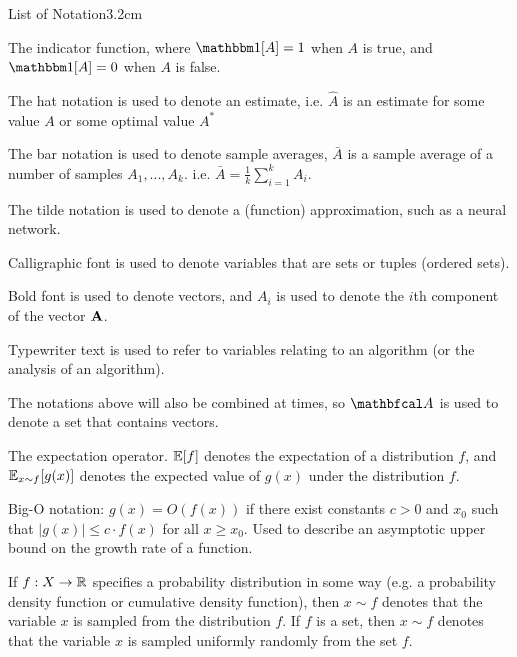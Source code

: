 \begin{mclistof}{List of Notation}{3.2cm}
    \item[\Large\textbf{General Notation}\hfill\hfill]
    \item[$\one$] 
        The indicator function, where $\one[A]=1$ when $A$ is true, and $\one[A]=0$ when $A$ is false. 
    \item[$\hat{A}$] 
        The hat notation is used to denote an estimate, i.e. $\hat{A}$ is an estimate for some value $A$ or some optimal value $A^*$
    \item[$\bar{A}$] 
        The bar notation is used to denote sample averages, $\bar{A}$ is a sample average of a number of samples $A_1,...,A_k$. i.e. $\bar{A}=\frac{1}{k}\sum_{i=1}^k A_i$.
    \item[$\tilde{A}$] 
        The tilde notation is used to denote a (function) approximation, such as a neural network.
    \item[$\cl{A}$] 
        Calligraphic font is used to denote variables that are sets or tuples (ordered sets).
    \item[$\bff{A}$] 
        Bold font is used to denote vectors, and $A_i$ is used to denote the $i$th component of the vector $\bff{A}$.
    \item[$\texttt{A}$]
        Typewriter text is used to refer to variables relating to an algorithm (or the analysis of an algorithm).
    \item[$\bfcl{A}$] 
        The notations above will also be combined at times, so $\bfcl{A}$ is used to denote a set that contains vectors.
    \item[$\bb{E}$] 
        The expectation operator. $\mathbb{E}[f]$ denotes the expectation of a distribution $f$, and $\mathbb{E}_{x\sim f}[g(x)]$ denotes the expected value of $g(x)$ under the distribution $f$.
    \item[$O(f(x))$]
        Big-O notation: $g(x) = O(f(x))$ if there exist constants $c > 0$ and $x_0$ such that $|g(x)| \leq c \cdot f(x)$ for all $x \geq x_0$. Used to describe an asymptotic upper bound on the growth rate of a function.
    \item[$x\sim f$] 
        If $f:X\rightarrow\mathbb{R}$ specifies a probability distribution in some way (e.g. a probability density function or cumulative density function), then $x\sim f$ denotes that the variable $x$ is sampled from the distribution $f$. If $f$ is a set, then $x\sim f$ denotes that the variable $x$ is sampled uniformly randomly from the set $f$. 

\end{mclistof}
